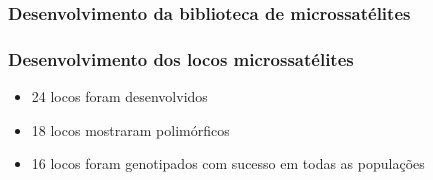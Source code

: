 \documentclass{beamer}
\begin{document}
\begin{frame}
  \frametitle{Desenvolvimento  da biblioteca de microssatélites}

  \end{frame}

\begin{frame}
  \frametitle{Desenvolvimento dos locos microssatélites}
  \begin{itemize}[<+->]
  \item 24 locos foram desenvolvidos
  \item 18 locos mostraram polimórficos
  \item 16 locos foram genotipados com sucesso em todas as popula\c{c}ões    
    \end{itemize}
  \end{frame}
\end{document}
